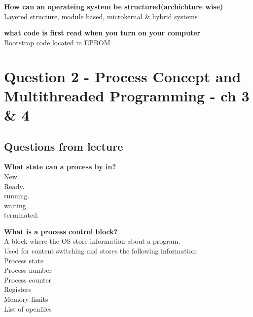 \documentclass[a4paper,10pt,titlepage]{report}
\begin{document}
\textbf{How can an operateing system be structured(archichture wise)\\}
\hspace{10mm} Layered structure, module based, microkernal \& hybrid systems\\ \vspace{5mm}

 
\textbf{what code is first read when you turn on your computer\\}
\hspace{10mm}Bootstrap code located in EPROM \\ \vspace{5mm}

\newpage
\section{Question 2 - Process Concept and Multithreaded Programming - ch 3 \& 4}

\subsection{Questions from lecture}
\textbf{What state can a process by in?\\}
\hspace{10mm}New.\\
\hspace{10mm}Ready.\\
\hspace{10mm}running.\\
\hspace{10mm}waiting.\\
\hspace{10mm}terminated.\\
\vspace{5mm}

\textbf{What is a process control block?\\}
\hspace{10mm}A block where the OS store information about a program.\\ 
\hspace{10mm}Used for content switching and stores the following information:\\
\hspace{20mm}Process state\\
\hspace{20mm}Process number\\
\hspace{20mm}Process counter\\
\hspace{20mm}Registers\\
\hspace{20mm}Memory limits\\
\hspace{20mm}List of openfiles\\
\end{document}
